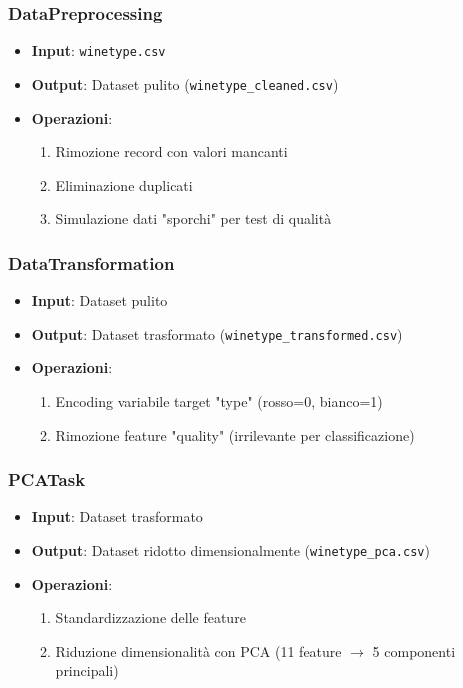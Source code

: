 \documentclass[a4paper, 12pt]{article}
\begin{document}
\subsubsection{DataPreprocessing}
\begin{itemize}
    \item \textbf{Input}: \texttt{winetype.csv}
    \item \textbf{Output}: Dataset pulito (\texttt{winetype\_cleaned.csv})
    \item \textbf{Operazioni}:
    \begin{enumerate}
        \item Rimozione record con valori mancanti
        \item Eliminazione duplicati
        \item Simulazione dati "sporchi" per test di qualità
    \end{enumerate}
\end{itemize}

\subsubsection{DataTransformation}
\begin{itemize}
    \item \textbf{Input}: Dataset pulito
    \item \textbf{Output}: Dataset trasformato (\texttt{winetype\_transformed.csv})
    \item \textbf{Operazioni}:
    \begin{enumerate}
        \item Encoding variabile target "type" (rosso=0, bianco=1)
        \item Rimozione feature "quality" (irrilevante per classificazione)
    \end{enumerate}
\end{itemize}

\subsubsection{PCATask}
\begin{itemize}
    \item \textbf{Input}: Dataset trasformato
    \item \textbf{Output}: Dataset ridotto dimensionalmente (\texttt{winetype\_pca.csv})
    \item \textbf{Operazioni}:
    \begin{enumerate}
        \item Standardizzazione delle feature
        \item Riduzione dimensionalità con PCA (11 feature \(\rightarrow\) 5 componenti principali)
    \end{enumerate}
\end{itemize}
\end{document}
